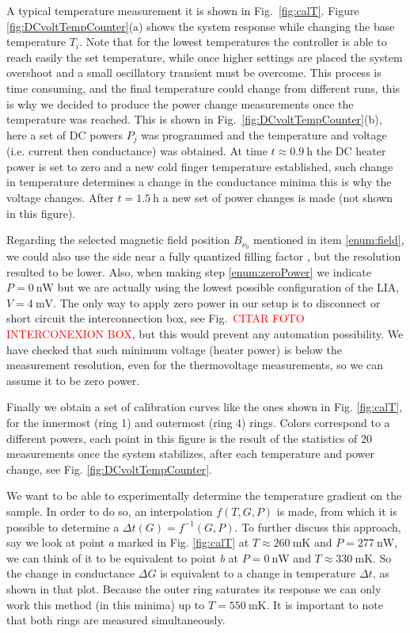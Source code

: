 A typical temperature measurement it is shown in Fig.~\ref{fig:calT}. Figure \ref{fig:DCvoltTempCounter}(a) shows the system response while changing the base temperature $T_i$. Note that for the lowest temperatures the controller is able to reach easily the set temperature, while once higher settings are placed the system overshoot and a small oscillatory transient must be overcome. This process is time consuming, and the final temperature could change from different runs, this is why we decided to produce the power change measurements once the temperature was reached. This is shown in Fig.~\ref{fig:DCvoltTempCounter}(b), here a set of DC powers $P_j$ was programmed and the temperature and voltage (i.e. current then conductance) was obtained. At time $t \approx \SI{0.9}{\hour}$ the DC heater power is set to zero and a new cold finger temperature established, such change in temperature determines a change in the  conductance minima this is why the voltage changes. After $t = \SI{1.5}{\hour} $ a new set of power changes is made (not shown in this figure). 

Regarding the selected magnetic field position $B_{\nu_0}$ mentioned in item \ref{enum:field}, we could also use the side near a fully quantized filling factor \cite{chickeringPhD}, but the resolution resulted to be lower. Also, when making step \ref{enum:zeroPower} we indicate $P = \SI{0}{\nano\watt}$ but we are actually using the lowest possible configuration of the LIA, $V = \SI{4}{\milli\volt}$. The only way to apply zero power in our setup is to disconnect or short circuit the interconnection box, see Fig.~\textcolor{red}{CITAR FOTO INTERCONEXION BOX}, but this would prevent any automation possibility. We have checked that such minimum voltage (heater power) is below the measurement resolution, even for the thermovoltage measurements, so we can assume it to be zero power.

Finally we obtain a set of calibration curves like the ones shown in Fig. \ref{fig:calT}, for the innermost (ring 1) and outermost (ring 4) rings. Colors correspond to a different powers, each point in this figure is the result of the statistics of 20 measurements once the system stabilizes, after each temperature and power change, see Fig. \ref{fig:DCvoltTempCounter}.  

We want to be able to experimentally determine the temperature gradient on the sample. In order to do so, an interpolation $f(T, G, P)$ is made, from which it is possible to determine a $\Delta t (G) = f^{-1}(G,P)$. To further discuss this approach, say we look at point \textit{a} marked in Fig. \ref{fig:calT} at $T \approx \SI{260}{\milli\kelvin}$ and $P = \SI{277}{\nano\watt}$, we can think of it to be equivalent to point \textit{b} at $P = \SI{0}{\nano\watt}$ and $T \approx \SI{330}{\milli\kelvin}$. So the change in conductance $\Delta G$ is equivalent to a change in temperature $\Delta t$, as shown in that plot.
Because the outer ring saturates its response we can only work this method (in this minima) up to $T = \SI{550}{\milli\kelvin}$. It is important to note that both rings are measured simultaneously.


